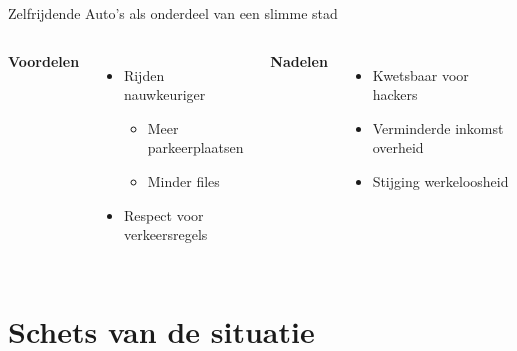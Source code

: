 \documentclass[aspectratio=169,kulak,t,handout]{kulakbeamer} %
\begin{document}
\begin{frame}{Zelfrijdende Auto's als onderdeel van een slimme stad}
	\begin{columns}
	\centering
	{\bf{Voordelen}}\\[.2cm]

		\begin{itemize}
			\large\item Rijden nauwkeuriger
			\begin{itemize}
				\normalsize\item Meer parkeerplaatsen
				\item Minder files
			\end{itemize}
			\item Respect voor verkeersregels
			
		\end{itemize}
	\centering
	{\bf{Nadelen}}\\[.2cm]

			\begin{itemize}
			\large\item Kwetsbaar voor hackers
			\item Verminderde inkomst overheid
			\item Stijging werkeloosheid
			\end{itemize}
	
	\end{columns}
\end{frame}

\begin{outlineframe}[Overzicht]
	\tableofcontents
\end{outlineframe}


\section{Schets van de situatie}
\end{document}
